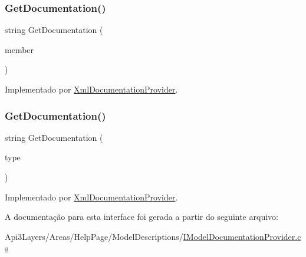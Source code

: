 \subsubsection{\texorpdfstring{Get\+Documentation()}{GetDocumentation()}\hspace{0.1cm}{\footnotesize\ttfamily [1/2]}}
{\footnotesize\ttfamily string Get\+Documentation (\begin{DoxyParamCaption}\item[{Member\+Info}]{member }\end{DoxyParamCaption})}



Implementado por \hyperlink{classApi3Layers_1_1Areas_1_1HelpPage_1_1XmlDocumentationProvider_aa774bb352a769421583abb335a1cec8a}{Xml\+Documentation\+Provider}.

\mbox{\label{interfaceApi3Layers_1_1Areas_1_1HelpPage_1_1ModelDescriptions_1_1IModelDocumentationProvider_af771cd863288942e506d28447daf4f82}} 
\subsubsection{\texorpdfstring{Get\+Documentation()}{GetDocumentation()}\hspace{0.1cm}{\footnotesize\ttfamily [2/2]}}
{\footnotesize\ttfamily string Get\+Documentation (\begin{DoxyParamCaption}\item[{Type}]{type }\end{DoxyParamCaption})}



Implementado por \hyperlink{classApi3Layers_1_1Areas_1_1HelpPage_1_1XmlDocumentationProvider_af771cd863288942e506d28447daf4f82}{Xml\+Documentation\+Provider}.



A documentação para esta interface foi gerada a partir do seguinte arquivo\+:\begin{DoxyCompactItemize}
\item 
Api3\+Layers/\+Areas/\+Help\+Page/\+Model\+Descriptions/\hyperlink{IModelDocumentationProvider_8cs}{I\+Model\+Documentation\+Provider.\+cs}\end{DoxyCompactItemize}
